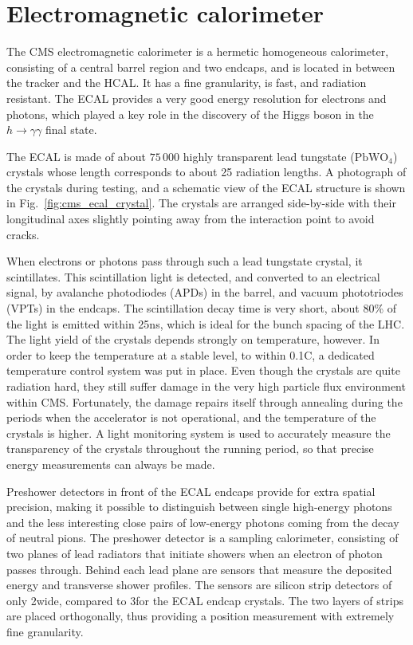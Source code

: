 \section{Electromagnetic calorimeter \label{sec:cms_ecal}}

The CMS electromagnetic calorimeter is a hermetic homogeneous calorimeter, consisting of a central
barrel region and two endcaps, and is located in between the tracker and the HCAL. 
It has a fine granularity, is fast, and radiation resistant.
The ECAL provides a very good energy resolution for electrons and photons, which played a key role
in the discovery of the Higgs boson in the $h\rightarrow\gamma\gamma$ final state. 

The ECAL is made of about $75\,000$ highly transparent lead tungstate ($\text{PbWO}_\text{4}$)
crystals whose length corresponds to about 25 radiation lengths. A photograph of the crystals
during testing, and a schematic view of the ECAL structure is shown in
Fig.~\ref{fig:cms_ecal_crystal}. The crystals are arranged side-by-side with their longitudinal axes
slightly pointing away from the interaction point to avoid cracks.

When electrons or photons pass through such a lead tungstate crystal, it scintillates. 
This scintillation light is detected, and converted to an electrical signal, by avalanche
photodiodes (APDs) in the barrel, and vacuum phototriodes (VPTs) in the endcaps.
The scintillation decay time is very short, about 80\% of the light is emitted within 25\unit{ns},
which is ideal for the bunch spacing of the LHC. 
The light yield of the crystals depends strongly on temperature, however. In order to keep the
temperature at a stable level, to within 0.1\de C, a dedicated temperature control system was put in
place.
Even though the crystals are quite radiation hard, they still suffer damage in the very high
particle flux environment within CMS. Fortunately, the damage repairs itself through annealing
during the periods when the accelerator is not operational, and the temperature of the crystals is
higher. A light monitoring system is used to accurately measure the transparency of the crystals
throughout the running period, so that precise energy measurements can always be made. 

Preshower detectors in front of the ECAL endcaps provide for extra spatial precision, making it
possible to distinguish between single high-energy photons and the less interesting close pairs of
low-energy photons coming from the decay of neutral pions.
The preshower detector is a sampling calorimeter, consisting of two planes of lead radiators that
initiate showers when an electron of photon passes through. Behind each lead plane are sensors that
measure the deposited energy and transverse shower profiles. 
The sensors are silicon strip detectors of only 2\mm wide, compared to 3\cm for the ECAL endcap
crystals. The two layers of strips are placed orthogonally, thus providing a position
measurement with extremely fine granularity. 


